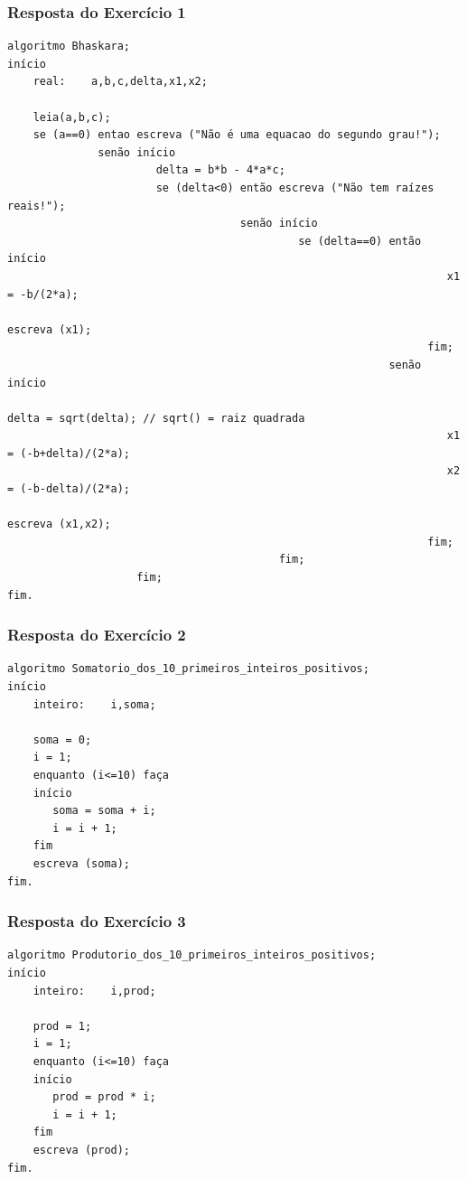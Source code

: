 \documentclass[aspectratio=169]{beamer}
\begin{document}
\begin{frame}[fragile]\frametitle{Resposta do Exercício 1}

{\tiny\begin{verbatim}
algoritmo Bhaskara;
início
    real:    a,b,c,delta,x1,x2;

    leia(a,b,c);
    se (a==0) entao escreva ("Não é uma equacao do segundo grau!");
              senão início
                       delta = b*b - 4*a*c;
                       se (delta<0) então escreva ("Não tem raízes reais!");
                                    senão início
                                             se (delta==0) então início
                                                                    x1 = -b/(2*a);
                                                                    escreva (x1);
                                                                 fim;
                                                           senão início
                                                                    delta = sqrt(delta); // sqrt() = raiz quadrada
                                                                    x1 = (-b+delta)/(2*a);
                                                                    x2 = (-b-delta)/(2*a);
                                                                    escreva (x1,x2);
                                                                 fim;
                                          fim;
                    fim;
fim.
\end{verbatim}}
\end{frame}

\begin{frame}[fragile]\frametitle{Resposta do Exercício 2}

\begin{verbatim}
algoritmo Somatorio_dos_10_primeiros_inteiros_positivos;
início
    inteiro:    i,soma;

    soma = 0;
    i = 1;
    enquanto (i<=10) faça
    início
       soma = soma + i;
       i = i + 1;
    fim
    escreva (soma);
fim.
\end{verbatim}
\end{frame}

\begin{frame}[fragile]\frametitle{Resposta do Exercício 3}

\begin{verbatim}
algoritmo Produtorio_dos_10_primeiros_inteiros_positivos;
início
    inteiro:    i,prod;

    prod = 1;
    i = 1;
    enquanto (i<=10) faça
    início
       prod = prod * i;
       i = i + 1;
    fim
    escreva (prod);
fim.
\end{verbatim}
\end{frame}
\end{document}
